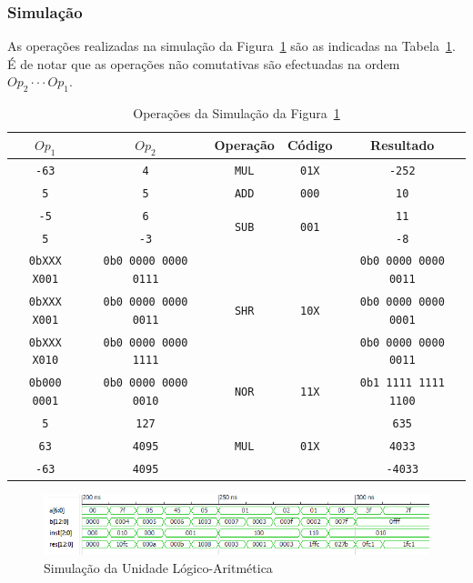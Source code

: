 \documentclass[a4paper]{article}
\begin{document}
\subsubsection{Simulação}
As operações realizadas na simulação da Figura~\ref{fig:ALUsim} são as indicadas na Tabela~\ref{tab:ALUsim}. É de notar que as operações não comutativas são efectuadas na ordem $ Op_2 \cdot \cdot \cdot Op_1 $.
\begin{table}[h]
	\begin{tabular}{|c | c || c | c | c|}
		\hline
		$Op_1$ & $Op_2$ & Operação & Código & Resultado \\
		\hline
		\texttt{-63} & \texttt{4} & \texttt{MUL} & \texttt{01X} & \texttt{-252} \\
		\hline
		\texttt{5} & \texttt{5} & \texttt{ADD} & \texttt{000} & \texttt{10} \\
		\hline
		\texttt{-5} & \texttt{6} & \multirow{2}{*}{\texttt{SUB}} & \multirow{2}{*}{\texttt{001}} & \texttt{11} \\
		\texttt{5} & \texttt{-3} & & & \texttt{-8} \\
		\hline
		\texttt{0bXXX X001} & \texttt{0b0 0000 0000 0111} & \multirow{3}{*}{\texttt{SHR}} & \multirow{3}{*}{\texttt{10X}} & \texttt{0b0 0000 0000 0011} \\
		\texttt{0bXXX X001} & \texttt{0b0 0000 0000 0011} & & & \texttt{0b0 0000 0000 0001} \\
		\texttt{0bXXX X010} & \texttt{0b0 0000 0000 1111} & & & \texttt{0b0 0000 0000 0011} \\
		\hline
		\texttt{0b000 0001} & \texttt{0b0 0000 0000 0010} & \texttt{NOR} & \texttt{11X} & \texttt{0b1 1111 1111 1100} \\
		\hline
		\texttt{5} & \texttt{127} & \multirow{3}{*}{\texttt{MUL}} & \multirow{3}{*}{\texttt{01X}} & \texttt{635} \\
		\texttt{63} & \texttt{4095} & & & \texttt{4033} \\
		\texttt{-63} & \texttt{4095} & & & \texttt{-4033} \\
		\hline
	\end{tabular}
	\caption{Operações da Simulação da Figura~\ref{fig:ALUsim}}
	\label{tab:ALUsim}
\end{table}

\begin{figure}[h]
	\centering
	\includegraphics[width=\textwidth]{ALU_sim}
	\caption{Simulação da Unidade Lógico-Aritmética}
	\label{fig:ALUsim}
\end{figure}
\pagebreak
\end{document}
